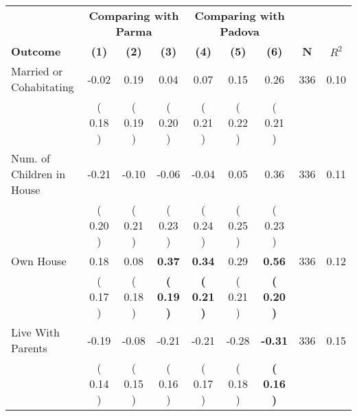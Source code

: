 \begin{tabular}{lcccccccc}
\toprule
 & \multicolumn{3}{c}{\textbf{Comparing with Parma}} & \multicolumn{3}{c}{\textbf{Comparing with Padova}} & \\
\cmidrule(lr){2-4} \cmidrule(lr){5-7} 
 \textbf{Outcome} & \textbf{(1)} & \textbf{(2)} & \textbf{(3)} & \textbf{(4)} & \textbf{(5)} & \textbf{(6)} & \textbf{N} & \textbf{$ R^2$} \\
\midrule
Married or Cohabitating &     -0.02 &      0.19 &      0.04 &      0.07 &      0.15 &      0.26 & 336 &       0.10 \\ 
 & (     0.18 ) & (     0.19 ) & (     0.20 ) & (     0.21 ) & (     0.22 ) & (     0.21 ) & \\
Num. of Children in House &     -0.21 &     -0.10 &     -0.06 &     -0.04 &      0.05 &      0.36 & 336 &       0.11 \\ 
 & (     0.20 ) & (     0.21 ) & (     0.23 ) & (     0.24 ) & (     0.25 ) & (     0.23 ) & \\
Own House &      0.18 &      0.08 & \textbf{     0.37} & \textbf{     0.34} &      0.29 & \textbf{     0.56} & 336 &       0.12 \\ 
 & (     0.17 ) & (     0.18 ) & \textbf{(     0.19 )} & \textbf{(     0.21 )} & (     0.21 ) & \textbf{(     0.20 )} & \\
Live With Parents &     -0.19 &     -0.08 &     -0.21 &     -0.21 &     -0.28 & \textbf{    -0.31} & 336 &       0.15 \\ 
 & (     0.14 ) & (     0.15 ) & (     0.16 ) & (     0.17 ) & (     0.18 ) & \textbf{(     0.16 )} & \\
\bottomrule
\end{tabular}
